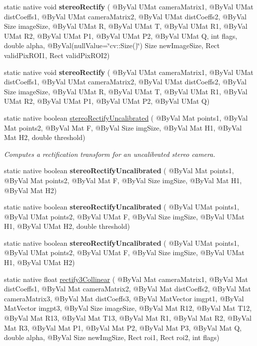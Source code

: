 \begin{DoxyCompactItemize}
\item 
static native void {\bfseries stereo\+Rectify} ( @By\+Val U\+Mat camera\+Matrix1, @By\+Val U\+Mat dist\+Coeffs1, @By\+Val U\+Mat camera\+Matrix2, @By\+Val U\+Mat dist\+Coeffs2, @By\+Val Size image\+Size, @By\+Val U\+Mat R, @By\+Val U\+Mat T, @By\+Val U\+Mat R1, @By\+Val U\+Mat R2, @By\+Val U\+Mat P1, @By\+Val U\+Mat P2, @By\+Val U\+Mat Q, int flags, double alpha, @By\+Val(null\+Value=\char`\"{}cv\+::\+Size()\char`\"{}) Size new\+Image\+Size, Rect valid\+Pix\+R\+O\+I1, Rect valid\+Pix\+R\+O\+I2)
\item 
static native void {\bfseries stereo\+Rectify} ( @By\+Val U\+Mat camera\+Matrix1, @By\+Val U\+Mat dist\+Coeffs1, @By\+Val U\+Mat camera\+Matrix2, @By\+Val U\+Mat dist\+Coeffs2, @By\+Val Size image\+Size, @By\+Val U\+Mat R, @By\+Val U\+Mat T, @By\+Val U\+Mat R1, @By\+Val U\+Mat R2, @By\+Val U\+Mat P1, @By\+Val U\+Mat P2, @By\+Val U\+Mat Q)
\item 
static native boolean \hyperlink{group__calib3d_ga2a00c796082466a7d1000418118e02d2}{stereo\+Rectify\+Uncalibrated} ( @By\+Val Mat points1, @By\+Val Mat points2, @By\+Val Mat F, @By\+Val Size img\+Size, @By\+Val Mat H1, @By\+Val Mat H2, double threshold)
\begin{DoxyCompactList}\small\item\em Computes a rectification transform for an uncalibrated stereo camera. \end{DoxyCompactList}\item 
static native boolean {\bfseries stereo\+Rectify\+Uncalibrated} ( @By\+Val Mat points1, @By\+Val Mat points2, @By\+Val Mat F, @By\+Val Size img\+Size, @By\+Val Mat H1, @By\+Val Mat H2)
\item 
static native boolean {\bfseries stereo\+Rectify\+Uncalibrated} ( @By\+Val U\+Mat points1, @By\+Val U\+Mat points2, @By\+Val U\+Mat F, @By\+Val Size img\+Size, @By\+Val U\+Mat H1, @By\+Val U\+Mat H2, double threshold)
\item 
static native boolean {\bfseries stereo\+Rectify\+Uncalibrated} ( @By\+Val U\+Mat points1, @By\+Val U\+Mat points2, @By\+Val U\+Mat F, @By\+Val Size img\+Size, @By\+Val U\+Mat H1, @By\+Val U\+Mat H2)
\item 
static native float \hyperlink{group__calib3d_ga44e3e2ed99710a5b0679459a2988bbd9}{rectify3\+Collinear} ( @By\+Val Mat camera\+Matrix1, @By\+Val Mat dist\+Coeffs1, @By\+Val Mat camera\+Matrix2, @By\+Val Mat dist\+Coeffs2, @By\+Val Mat camera\+Matrix3, @By\+Val Mat dist\+Coeffs3, @By\+Val Mat\+Vector imgpt1, @By\+Val Mat\+Vector imgpt3, @By\+Val Size image\+Size, @By\+Val Mat R12, @By\+Val Mat T12, @By\+Val Mat R13, @By\+Val Mat T13, @By\+Val Mat R1, @By\+Val Mat R2, @By\+Val Mat R3, @By\+Val Mat P1, @By\+Val Mat P2, @By\+Val Mat P3, @By\+Val Mat Q, double alpha, @By\+Val Size new\+Img\+Size, Rect roi1, Rect roi2, int flags)

\end{DoxyCompactItemize}
